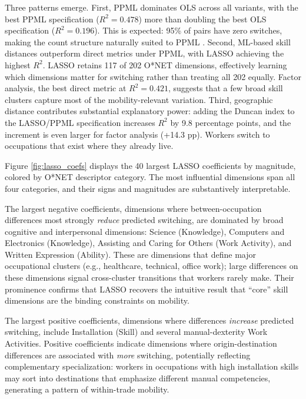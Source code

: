 \documentclass[12pt]{article}
\begin{document}
Three patterns emerge. First, PPML dominates OLS across all variants, with the best PPML specification ($R^2 = 0.478$) more than doubling the best OLS specification ($R^2 = 0.196$). This is expected: 95\% of pairs have zero switches, making the count structure naturally suited to PPML \citep{santos2006}. Second, ML-based skill distances outperform direct metrics under PPML, with LASSO achieving the highest $R^2$. LASSO retains 117 of 202 O*NET dimensions, effectively learning which dimensions matter for switching rather than treating all 202 equally. Factor analysis, the best direct metric at $R^2 = 0.421$, suggests that a few broad skill clusters capture most of the mobility-relevant variation. Third, geographic distance contributes substantial explanatory power: adding the Duncan index to the LASSO/PPML specification increases $R^2$ by 9.8 percentage points, and the increment is even larger for factor analysis (+14.3 pp). Workers switch to occupations that exist where they already live.

Figure \ref{fig:lasso_coefs} displays the 40 largest LASSO coefficients by magnitude, colored by O*NET descriptor category. The most influential dimensions span all four categories, and their signs and magnitudes are substantively interpretable.

The largest negative coefficients, dimensions where between-occupation differences most strongly \emph{reduce} predicted switching, are dominated by broad cognitive and interpersonal dimensions: Science (Knowledge), Computers and Electronics (Knowledge), Assisting and Caring for Others (Work Activity), and Written Expression (Ability). These are dimensions that define major occupational clusters (e.g., healthcare, technical, office work); large differences on these dimensions signal cross-cluster transitions that workers rarely make. Their prominence confirms that LASSO recovers the intuitive result that ``core'' skill dimensions are the binding constraints on mobility.

The largest positive coefficients, dimensions where differences \emph{increase} predicted switching, include Installation (Skill) and several manual-dexterity Work Activities. Positive coefficients indicate dimensions where origin-destination differences are associated with \emph{more} switching, potentially reflecting complementary specialization: workers in occupations with high installation skills may sort into destinations that emphasize different manual competencies, generating a pattern of within-trade mobility.
\end{document}

